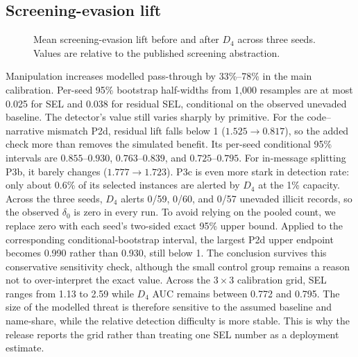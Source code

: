 \documentclass[conference]{IEEEtran}
\begin{document}
\subsection{Screening-evasion lift}
\begin{figure}[!t]
\centering
{}
\caption{Mean screening-evasion lift before and after $D_4$ across three
seeds. Values are relative to the published screening abstraction.}
\label{fig:sel}
\end{figure}
Manipulation increases modelled pass-through by 33\%--78\% in the main
calibration. Per-seed 95\% bootstrap half-widths from 1,000 resamples are at
most 0.025 for SEL and 0.038 for residual SEL, conditional on the observed
unevaded baseline. The detector's value still varies sharply by primitive. For
the code--narrative mismatch P2d, residual lift falls below 1
($1.525\rightarrow0.817$), so the added check more than removes the simulated
benefit. Its per-seed conditional 95\% intervals are $0.855$--$0.930$,
$0.763$--$0.839$, and $0.725$--$0.795$. For in-message splitting P3b, it
barely changes
($1.777\rightarrow1.723$). P3c is even more stark in detection rate: only about
0.6\% of its selected instances are alerted by $D_4$ at the 1\% capacity.
Across the three seeds, $D_4$ alerts 0/59, 0/60, and 0/57 unevaded illicit
records, so the observed $\delta_0$ is zero in every run. To avoid relying on
the pooled count, we replace zero with each seed's two-sided exact 95\% upper
bound. Applied to the corresponding conditional-bootstrap interval, the
largest P2d upper endpoint becomes 0.990 rather than 0.930, still below 1. The
conclusion survives this conservative sensitivity check, although the small
control group remains a reason not to over-interpret the exact value.
Across the $3\times3$ calibration grid, SEL ranges from 1.13 to 2.59 while
$D_4$ AUC remains between 0.772 and 0.795. The size of the modelled threat is
therefore sensitive to the assumed baseline and name-share, while the relative
detection difficulty is more stable. This is why the release reports the grid
rather than treating one SEL number as a deployment estimate.
\end{document}
